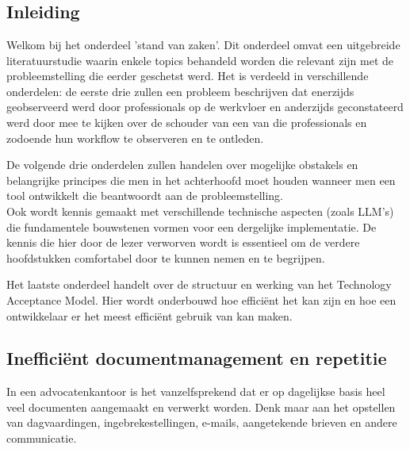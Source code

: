\chapter{}%
\label{ch:stand-van-zaken}



\section{Inleiding}
Welkom bij het onderdeel 'stand van zaken'.
Dit onderdeel omvat een uitgebreide literatuurstudie waarin enkele topics behandeld worden die relevant zijn met de probleemstelling die eerder geschetst werd.
Het is verdeeld in verschillende onderdelen: de eerste drie zullen een probleem beschrijven dat enerzijds geobserveerd werd door professionals op de
werkvloer en anderzijds geconstateerd werd door mee te kijken over de schouder van een van die professionals en zodoende hun workflow te observeren en te ontleden.

De volgende drie onderdelen zullen handelen over mogelijke obstakels en belangrijke principes die men in het achterhoofd moet houden wanneer men een tool ontwikkelt die beantwoordt aan de probleemstelling.\\

Ook wordt kennis gemaakt met verschillende technische aspecten (zoals \Gls{LLM}'s) die fundamentele bouwstenen vormen voor een dergelijke implementatie.
De kennis die hier door de lezer verworven wordt is essentieel om de verdere hoofdstukken comfortabel door te kunnen nemen en te begrijpen.

Het laatste onderdeel handelt over de structuur en werking van het Technology Acceptance Model.
Hier wordt onderbouwd hoe efficiënt het kan zijn en hoe een ontwikkelaar er het meest efficiënt gebruik van kan maken.

\newpage


\section{Inefficiënt documentmanagement en repetitie}
In een advocatenkantoor is het vanzelfsprekend dat er op dagelijkse basis heel veel documenten aangemaakt en verwerkt worden.
Denk maar aan het opstellen van dagvaardingen, ingebrekestellingen, e-mails, aangetekende brieven en andere communicatie.

